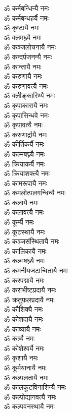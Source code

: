 \begin{flushleft}
\begin{multicols}{2}
ॐ कर्मबन्धिन्यै नमः\hfill{}\\
ॐ कर्मबन्धहर्यै नमः\\
ॐ कृष्टायै नमः\\
ॐ क्लमघ्न्यै नमः\\
ॐ कञ्जलोचनायै नमः\\
ॐ कन्दर्पजनन्यै नमः\\
ॐ कान्तायै नमः\\
ॐ करुणायै नमः\\
ॐ करुणावत्यै नमः\\
ॐ क्लीङ्कारिण्यै नमः\\
ॐ कृपाकारायै नमः\hfill{}\\
ॐ कृपासिन्धवे नमः\\
ॐ कृपावत्यै नमः\\
ॐ करुणार्द्रायै नमः\\
ॐ कीर्तिकर्यै नमः\\
ॐ कल्मषघ्न्यै नमः\\
ॐ क्रियाकर्यै नमः\\
ॐ क्रियाशक्त्यै नमः\\
ॐ कामरूपायै नमः\\
ॐ कमलोत्पलगन्धिन्यै नमः\\
ॐ कलायै नमः\hfill{}\\
ॐ कलावत्यै नमः\\
ॐ कूर्म्यै नमः\\
ॐ कूटस्थायै नमः\\
ॐ कञ्जसंस्थितायै नमः\\
ॐ कालिकायै नमः\\
ॐ कल्मषघ्न्यै नमः\\
ॐ कमनीयजटान्वितायै नमः\\
ॐ करपद्मायै नमः\\
ॐ कराभीष्टप्रदायै नमः\\
ॐ क्रतुफलप्रदायै नमः\hfill{}\\
ॐ कौशिक्यै नमः\\
ॐ कोशदायै नमः\\
ॐ काव्यायै नमः\\
ॐ कर्त्र्यै नमः\\
ॐ कोशेश्वर्यै नमः\\
ॐ कृशायै नमः\\
ॐ कूर्मयानायै नमः\\
ॐ कल्पलतायै नमः\\
ॐ कालकूटविनाशिन्यै नमः\\
ॐ कल्पोद्यानवत्यै नमः\hfill{}\\
ॐ कल्पवनस्थायै नमः\\

\end{multicols}
\end{flushleft}
